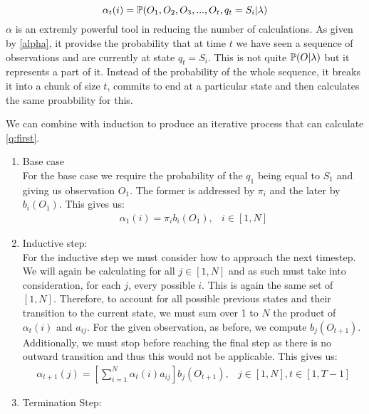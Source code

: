 \begin{equation}
    \label{alpha}
    \alpha_t(i) = \mathbb{P} (O_1,O_2,O_3,...,O_t,q_t=S_i | \lambda)
\end{equation}
$\alpha$ is an extremly powerful tool in reducing the number of calculations. As given by \ref{alpha}, it providse the probability that at time $t$ we have seen a sequence of observations and are currently at state $q_t=S_i$. This is not quite $\mathbb{P} (O | \lambda)$ but it represents a part of it. Instead of the probability of the whole sequence, it breaks it into a chunk of size $t$, commits to end at a particular state and then calculates the same proabbility for this.

We can combine \label{alpha} with induction to produce an iterative process that can calculate \ref{q:first}.

\begin{enumerate}[i]
    \item Base case \\
    For the base case we require the probability of the $q_1$ being equal to $S_1$ and giving us observation $O_1$. The former is addressed by $\pi_i$ and the later by $b_i(O_1)$. This gives us:
    \begin{eqnarray}
        \alpha_1(i) = \pi_i b_i(O_1), & i \in [1,N]
    \end{eqnarray}

    \item Inductive step: \\
    For the inductive step we must consider how to approach the next timestep. We will again be calculating for all $j\in [1,N]$ and as such must take into consideration, for each $j$, every possible $i$. This is again the same set of $[1,N]$. Therefore, to account for all possible previous states and their transition to the current state, we must sum over 1 to $N$ the product of $\alpha_t(i)$ and $a_{ij}$. For the given observation, as before, we compute $b_j(O_{t+1})$. Additionally, we must stop before reaching the final step as there is no outward transition and thus this would not be applicable. This gives us:
    \begin{eqnarray}
        \alpha_{t+1}(j) = \left[\sum_{i=1}^N \alpha_t(i)a_{ij}\right] b_j(O_{t+1}), & j \in [1,N], t \in [1,T-1]
    \end{eqnarray}

    \item Termination Step: \\
    
\end{enumerate}


